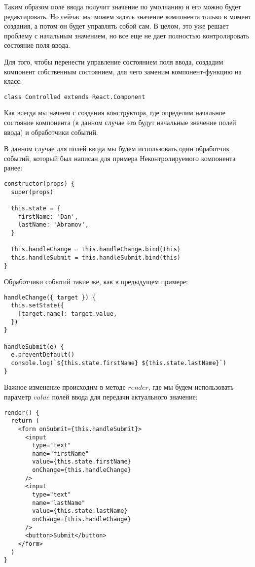 Таким образом поле ввода получит значение по умолчанию и его можно будет редактировать. Но сейчас мы можем задать значение компонента только в момент создания, а потом он будет управлять собой сам. В целом, это уже решает проблему с начальным значением, но все еще не дает полностью контролировать состояние поля ввода.

Для того, чтобы перенести управление состоянием поля ввода, создадим компонент собственным состоянием, для чего заменим компонент-функцию на класс:

\begin{lstlisting}
class Controlled extends React.Component	
\end{lstlisting}

Как всегда мы начнем с создания конструктора, где определим начальное состояние компонента (в данном случае это будут начальные значение полей ввода) и обработчики событий.

В данном случае для полей ввода мы будем использовать один обработчик событий, который был написан для примера Неконтролируемого компонента ранее:

\begin{lstlisting}
constructor(props) {
  super(props)
  
  this.state = {
    firstName: 'Dan',
    lastName: 'Abramov',
  }
  
  this.handleChange = this.handleChange.bind(this)
  this.handleSubmit = this.handleSubmit.bind(this)
}
\end{lstlisting}

Обработчики событий такие же, как в предыдущем примере:

\begin{lstlisting}
handleChange({ target }) {
  this.setState({
    [target.name]: target.value,
  })
}

handleSubmit(e) {
  e.preventDefault()
  console.log(`${this.state.firstName} ${this.state.lastName}`)
}
\end{lstlisting}

Важное изменение происходим в методе $render$, где мы будем использовать параметр $value$ полей ввода для передачи актуального значение:

\begin{lstlisting}
render() {
  return (
    <form onSubmit={this.handleSubmit}>
      <input
        type="text"
        name="firstName"
        value={this.state.firstName}
        onChange={this.handleChange}
      /> 
      <input
        type="text"
        name="lastName"
        value={this.state.lastName}
        onChange={this.handleChange}
      />
      <button>Submit</button>
    </form> 
  )
}
\end{lstlisting}

